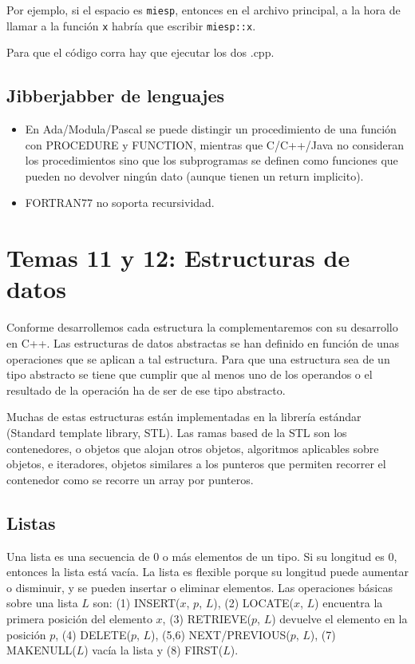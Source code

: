 \documentclass[a4paper]{article}
\begin{document}
	 Por ejemplo, si el espacio es \verb|miesp|, entonces en el archivo principal, a la hora de llamar a la función \verb|x| habría que escribir \verb|miesp::x|.
	 
	 Para que el código corra hay que ejecutar los dos .cpp.
	 
	 \subsection{Jibberjabber de lenguajes}
	 \begin{itemize}
	 	\item En Ada/Modula/Pascal se puede distingir un procedimiento de una función con PROCEDURE y FUNCTION, mientras que C/C++/Java no consideran los procedimientos sino que los subprogramas se definen como funciones que pueden no devolver ningún dato (aunque tienen un return implicito).
	 	\item FORTRAN77 no soporta recursividad.
	 \end{itemize}
	  
	 
	 \section{Temas 11 y 12: Estructuras de datos}	
	 
	Conforme desarrollemos cada estructura la complementaremos con su desarrollo en C++. Las estructuras de datos abstractas se han definido en función de unas operaciones que se aplican a tal estructura. Para que una estructura sea de un tipo abstracto se tiene que cumplir que al menos uno de los operandos o el resultado de la operación ha de ser de ese tipo abstracto.
	
	Muchas de estas estructuras están implementadas en la librería estándar (Standard template library, STL). Las ramas based de la STL son los contenedores, o objetos que alojan otros objetos, algoritmos aplicables sobre objetos, e iteradores, objetos similares a los punteros que permiten recorrer el contenedor como se recorre un array por punteros.
	
	\subsection{Listas}
	Una lista es una secuencia de 0 o más elementos de un tipo. Si su longitud es 0, entonces la lista está vacía. La lista es flexible porque su longitud puede aumentar o disminuir, y se pueden insertar o eliminar elementos. Las operaciones básicas sobre una lista $L$ son: (1) INSERT($x$, $p$, $L$), (2) LOCATE($x$, $L$) encuentra la primera posición del elemento $x$, (3) RETRIEVE($p$, $L$) devuelve el elemento en la posición $p$, (4) DELETE($p$, $L$), (5,6) NEXT/PREVIOUS($p$, $L$), (7) MAKENULL($L$) vacía la lista y (8) FIRST($L$).
	
\end{document}
